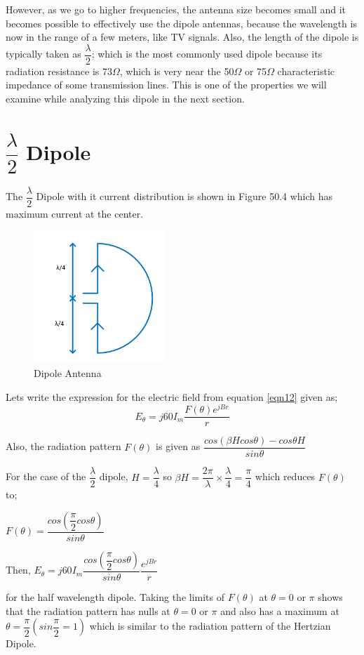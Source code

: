 However, as we go to higher frequencies, the antenna size becomes small and it becomes possible to effectively use the dipole antennas, because the wavelength is now in the range of a few meters, like TV signals. Also, the length of the dipole is typically taken as $\dfrac{\lambda}{2}$; which is the most commonly used dipole because its radiation resistance is 73$\Omega$, which is very near the 50$\Omega$ or 75$\Omega$ characteristic impedance of some transmission lines. This is one of the properties we will examine while analyzing this dipole in the next section.
\section{$\dfrac{\lambda}{2}$ Dipole}
The $\dfrac{\lambda}{2}$ Dipole with it current distribution is shown in Figure 50.4 which has maximum current at the center.
\begin{figure}[h]
\centering
\includegraphics[height=5cm]{./graphics/image53_4}
\caption{Dipole Antenna}
\label{fig:fig4}
\end{figure}
Lets write the expression for the electric field from equation \ref{eqn12} given as; 
\begin{equation*}
E_\theta = j60I_m \frac{F(\theta)e^{jBr}}{r}
\end{equation*}
\begin{center}
Also, the radiation pattern $F(\theta)$ is given as $\dfrac{cos(\beta H cos\theta) - cos\theta H}{sin \theta}$

For the case of the $\dfrac{\lambda}{2}$ dipole, $H = \dfrac{\lambda}{4}$ so $\beta H = \dfrac{2\pi}{\lambda} \times \dfrac{\lambda}{4}= \dfrac{\pi}{4} $ which reduces $F(\theta)$ to;

$F(\theta) = \dfrac{cos (\dfrac{\pi}{2} cos\theta)}{sin\theta}$

Then, $E_\theta = j60I_m \dfrac{cos (\dfrac{\pi}{2} cos\theta)}{sin\theta} \dfrac{e^{jBr}}{r}$ 
\end{center}for the half wavelength dipole.
Taking the limits of $F(\theta)$ at $\theta = 0$ or $\pi$ shows that the radiation pattern has nulls at $\theta = 0 \text{ or } \pi$ and also has a maximum at $\theta = \dfrac{\pi}{2} (sin \dfrac{\pi}{2} = 1)$ which is similar to the radiation pattern of the Hertzian Dipole.

